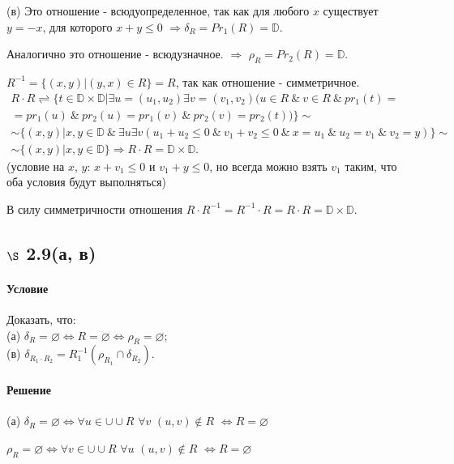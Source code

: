 \documentclass[a4paper,12pt]{article}
\begin{document}
\bigskip

(в) Это отношение - всюдуопределенное, так как для любого $x$ существует $y=-x$, для которого $x+y\leqslant 0$ $\Rightarrow \delta_R = Pr_1(R) = \mathbb{D}$.\par
Аналогично это отношение - всюдузначное. $\Rightarrow$ $\rho_R=Pr_2(R)=\mathbb{D}$.\par
$R^{-1} = \{(x,y)|(y,x)\in R\} = R$, так как отношение - симметричное.
\begin{gather*}
R\cdot R \rightleftharpoons \{t\in \mathbb{D}\times \mathbb{D} | \exists u=(u_1,u_2) \exists v=(v_1,v_2) (u\in R\  \& \ v\in R \ \& \ pr_1(t)=\\
= pr_1(u) \ \& \ pr_2(u)=pr_1(v) \ \& \ pr_2(v)=pr_2(t))\}\sim\\
\sim \{(x,y)|x,y\in \mathbb{D} \ \& \ \exists u \exists v (u_1+u_2\leqslant 0\ \& \ v_1+v_2\leqslant 0 \ \& \ x=u_1 \ \& \ u_2 = v_1 \ \& \ v_2 = y)\} \sim \\
\sim \{(x,y)|x,y\in \mathbb{D}\} \Rightarrow R\cdot R = \mathbb{D}\times \mathbb{D}.
\end{gather*}
(условие на $x$, $y$: $x+v_1\leqslant 0$ и $v_1+y\leqslant 0$, но всегда можно взять $v_1$ таким, что оба условия будут выполняться)\par
В силу симметричности отношения $R\cdot R^{-1} = R^{-1}\cdot R = R\cdot R = \mathbb{D}\times \mathbb{D}$.
\subsection*{$\S$ 2.9(а, в)}
\paragraph*{Условие}
Доказать, что:\\
(а) $\delta_R = \varnothing \Leftrightarrow R=\varnothing \Leftrightarrow \rho_R=\varnothing$;\\
(в) $\delta_{R_1\cdot R_2} = R_1^{-1} (\rho_{R_1} \cap \delta_{R_2})$.
\paragraph*{Решение}
(а) $\delta_R = \varnothing \Leftrightarrow \forall u \in  \cup \cup R$ $\forall v$ $(u,v)\notin R$ $\Leftrightarrow R=\varnothing$\par
$\rho_R = \varnothing \Leftrightarrow \forall v \in \cup \cup R$ $\forall u$ $(u,v)\notin R$ $\Leftrightarrow R=\varnothing$\par
\end{document}
